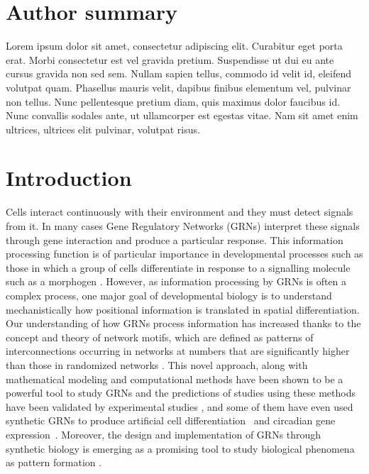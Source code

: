 \documentclass[10pt,letterpaper]{article}
\begin{document}
\section*{Author summary}
Lorem ipsum dolor sit amet, consectetur adipiscing elit. Curabitur eget porta 
erat. Morbi consectetur est vel gravida pretium. Suspendisse ut dui eu ante 
cursus gravida non sed sem. Nullam sapien tellus, commodo id velit id, eleifend 
volutpat quam. Phasellus mauris velit, dapibus finibus elementum vel, pulvinar 
non tellus. Nunc pellentesque pretium diam, quis maximus dolor faucibus id. Nunc
convallis sodales ante, ut ullamcorper est egestas vitae. Nam sit amet enim 
ultrices, ultrices elit pulvinar, volutpat risus.

\linenumbers

\section*{Introduction}

Cells interact continuously with their environment and they must detect signals
from it. In many cases Gene Regulatory Networks (GRNs) interpret these signals
through gene interaction and produce a particular response. This information
processing function is of particular importance in developmental processes such
as those in which a group of cells differentiate in response to a signalling
molecule such as a morphogen \cite{Turing1952, Wolpert1969}. However, as
information processing by GRNs is often a complex process, one major goal of
developmental biology is to understand mechanistically how positional
information is translated in spatial differentiation.\\

Our understanding of how GRNs process information has increased thanks to the
concept and theory of network motifs, which are defined as patterns of
interconnections occurring in networks at numbers that are significantly higher
than those in randomized networks \cite{Milo2002}. This novel approach, along
with mathematical modeling and computational methods have been shown to be a
powerful tool to study GRNs and the predictions of studies using these methods
have been validated by experimental studies
\cite{Kalir2005,Kalir2004,Mangan2003a,ODonnell2005}, and some of them 
have even used synthetic GRNs to produce artificial cell differentiation~\cite{Basu2005} 
and circadian gene expression~\cite{atkinson_development_2003}. Moreover, 
the design and implementation of GRNs through synthetic biology is emerging as 
a promising tool to study biological phenomena as pattern formation 
\cite{santos-moreno_using_2019}.
\end{document}
